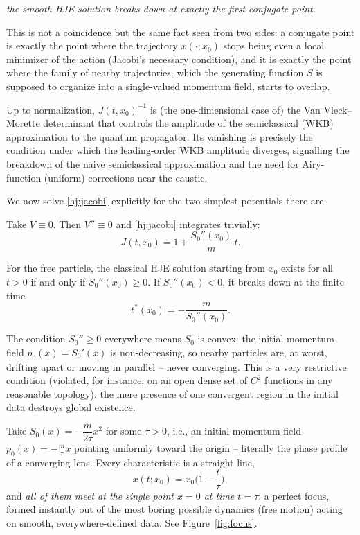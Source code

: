 \begin{center}
\emph{the smooth HJE solution breaks down at exactly the first conjugate point.}
\end{center}

This is not a coincidence but the same fact seen from two sides: a conjugate
point is exactly the point where the trajectory $x(\cdot;x_0)$ stops being even
a local minimizer of the action (Jacobi's necessary condition), and it is
exactly the point where the family of nearby trajectories, which the generating
function $S$ is supposed to organize into a single-valued momentum field,
starts to overlap.

\begin{remark}
Up to normalization, $J(t,x_0)^{-1}$ is (the one-dimensional case of) the Van
    Vleck--Morette determinant that controls the amplitude of the semiclassical
    (WKB) approximation to the quantum propagator. Its vanishing is precisely
    the condition under which the leading-order WKB amplitude diverges,
    signalling the breakdown of the naive semiclassical approximation and the
    need for Airy-function (uniform) corrections near the caustic.
\end{remark}

We now solve \eqref{hj:jacobi} explicitly for the two simplest potentials there are.

Take $V\equiv0$. Then $V''\equiv0$ and \eqref{hj:jacobi} integrates trivially:
\begin{equation}
J(t,x_0) = 1 + \frac{S_0''(x_0)}{m}\,t.
\label{hj:Jfree}
\end{equation}

\begin{proposition}
\label{prop:free}
For the free particle, the classical HJE solution starting from $x_0$ exists
    for all $t>0$ if and only if $S_0''(x_0)\ge 0$. If $S_0''(x_0)<0$, it
    breaks down at the finite time
\[
t^\ast(x_0) = -\frac{m}{S_0''(x_0)}.
\]
\end{proposition}

The condition $S_0''\ge0$ everywhere means $S_0$ is convex: the initial
momentum field $p_0(x)=S_0'(x)$ is non-decreasing, so nearby particles are, at
worst, drifting apart or moving in parallel -- never converging. This is a very
restrictive condition (violated, for instance, on an open dense set of $C^2$
functions in any reasonable topology): the mere presence of one convergent
region in the initial data destroys global existence.

Take $S_0(x) = -\dfrac{m}{2\tau}x^2$ for some $\tau>0$, i.e., an initial
    momentum field $p_0(x)=-\frac{m}{\tau}x$ pointing uniformly toward the
    origin -- literally the phase profile of a converging lens. Every
    characteristic is a straight line,
\[
x(t;x_0) = x_0\Big(1-\frac{t}{\tau}\Big),
\]
and \emph{all of them meet at the single point $x=0$ at time $t=\tau$}: a
    perfect focus, formed instantly out of the most boring possible dynamics
    (free motion) acting on smooth, everywhere-defined data. See
    Figure~\ref{fig:focus}.

